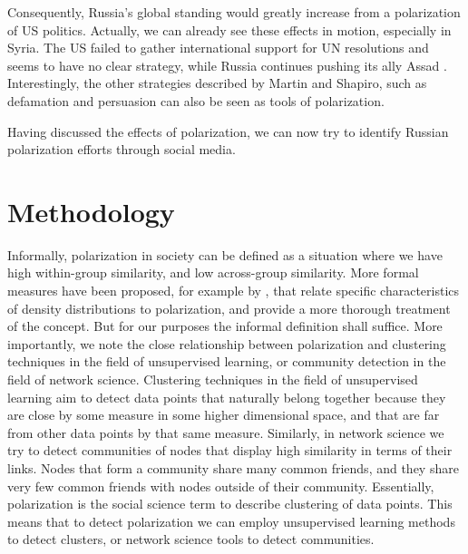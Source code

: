 \documentclass[12pt, authoryear]{elsarticle}
\begin{document}
Consequently, Russia's global standing would greatly increase from a polarization of US politics. Actually, we can already see these effects in motion, especially in Syria. The US failed to gather international support for UN resolutions and seems to have no clear strategy, while Russia continues pushing its ally Assad \citep{bolan_2019}. Interestingly, the other strategies described by Martin and Shapiro, such as defamation and persuasion can also be seen as tools of polarization. 

Having discussed the effects of polarization, we can now try to identify Russian polarization efforts through social media. 

\section{Methodology}
Informally, polarization in society can be defined as a situation where we have high within-group similarity, and low across-group similarity. More formal measures have been proposed, for example by \cite{duclos2004polarization}, that relate specific characteristics of density distributions to polarization, and provide a more thorough treatment of the concept. But for our purposes the informal definition shall suffice. More importantly, we note the close relationship between polarization and clustering techniques in the field of unsupervised learning, or community detection in the field of network science. Clustering techniques in the field of unsupervised learning aim to detect data points that naturally belong together because they are close by some measure in some higher dimensional space, and that are far from other data points by that same measure. Similarly, in network science we try to detect communities of nodes that display high similarity in terms of their links. Nodes that form a community share many common friends, and they share very few common friends with nodes outside of their community. Essentially, polarization is the social science term to describe clustering of data points. This means that to detect polarization we can employ unsupervised learning methods to detect clusters, or network science tools to detect communities. 
\end{document}
